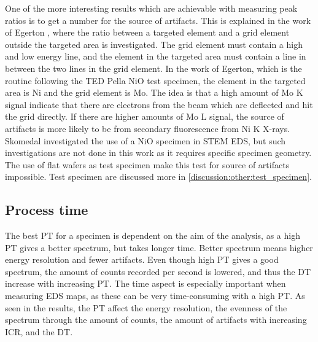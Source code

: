 One of the more interesting results which are achievable with measuring peak ratios is to get a number for the source of artifacts.
This is explained in the work of Egerton \cite{egerton_nio_characterization_1994}, where the ratio between a targeted element and a grid element outside the targeted area is investigated.
The grid element must contain a high and low energy line, and the element in the targeted area must contain a line in between the two lines in the grid element.
In the work of Egerton, which is the routine following the TED Pella NiO test specimen, the element in the targeted area is Ni and the grid element is Mo.
The idea is that a high amount of Mo K signal indicate that there are electrons from the beam which are deflected and hit the grid directly.
If there are higher amounts of Mo L signal, the source of artifacts is more likely to be from secondary fluorescence from Ni K X-rays.
Skomedal \cite{skomedal_improving_2022} investigated the use of a NiO specimen in STEM EDS, but such investigations are not done in this work as it requires specific specimen geometry.
The use of flat wafers as test specimen make this test for source of artifacts impossible.
Test specimen are discussed more in \cref{discussion:other:test_specimen}.









\subsection{Process time}
\label{discussion:process_time}

The best PT for a specimen is dependent on the aim of the analysis, as a high PT gives a better spectrum, but takes longer time.
Better spectrum means higher energy resolution and fewer artifacts.
Even though high PT gives a good spectrum, the amount of counts recorded per second is lowered, and thus the DT increase with increasing PT.
The time aspect is especially important when measuring EDS maps, as these can be very time-consuming with a high PT.
As seen in the results, the PT affect the energy resolution, the evenness of the spectrum through the amount of counts, the amount of artifacts with increasing ICR, and the DT. 


